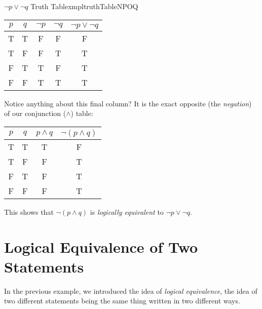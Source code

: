 \begin{exmpl}[label={exmpl:truthTableNPOQ}]{$\lnot p \lor \lnot q$ Truth Table}{xmpltruthTableNPOQ}
    \begin{center}
        \begin{tabular}{|c|c|c|c|c|}
            \hline
            $p$ & $q$ & $\lnot p$ & $\lnot q$ & $\lnot p \lor \lnot q$ \\
            \hline
            T   & T   & F         & F         & F                      \\
            \hline
            T   & F   & F         & T         & T                      \\
            \hline
            F   & T   & T         & F         & T                      \\
            \hline
            F   & F   & T         & T         & T                      \\
            \hline
        \end{tabular}
    \end{center}

    Notice anything about this final column? It is the exact opposite (the \emph{negation}) of our conjunction ($\land$) table:
    \begin{center}
        \begin{tabular}{|c|c|c|c|}
            \hline
            $p$ & $q$ & $p \land q$ & $\lnot(p \land q)$ \\
            \hline
            T   & T   & T           & F                  \\
            \hline
            T   & F   & F           & T                  \\
            \hline
            F   & T   & F           & T                  \\
            \hline
            F   & F   & F           & T                  \\
            \hline
        \end{tabular}
    \end{center}

    This shows that $\lnot (p \land q)$ is \emph{logically equivalent} to $\lnot p \lor \lnot q$.
\end{exmpl}

\section{Logical Equivalence of Two Statements}
In the previous example, we introduced the idea of \emph{logical equivalence}, the idea of two different statements being the same thing written in two different ways.

